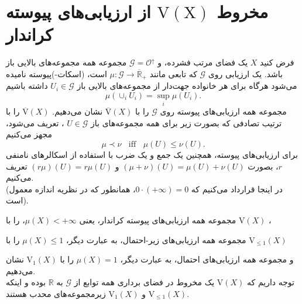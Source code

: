\documentclass[12pt,a4paper]{article}
\theoremstyle{definition}
\theoremstyle{theorem}
\theoremstyle{definition}
\newcommand{\bR}{\mathbb{R}}
\newcommand{\cO}{\mathcal{O}}
\newcommand{\cG}{\mathcal{G}}
\begin{document}
\section{ مخروط $\mathrm{V(X)}$ از ارزیابی‌های پیوسته کراندار}\label{3} 
فرض کنید
$ X $
یک فضای مرتب فشرده، و 
$ \cG=\cO^{\uparrow} $
مجموعه همه مجموعه‌های بالایی باز باشد.  یک ارزیابی روی 
$ \cG $
که تابعی مانند 
$ \mu:\cG\rightarrow \overline{\bR}_{+} $
 است،  (اسکات-)پیوسته 
 نامیده می‌شود هرگاه برای هر خانواده جهت‌دار از مجموعه‌های بالایی باز 
$ U_{i}\in \cG $
داشته باشیم 
$$ \mu(\cup_{i}U_{i})=\sup_{i}\mu(U_{i}). $$
مجموعه همه ارزیابی‌های پیوسته روی 
$ \cG $
را با 
$ \overline{\mathrm{V}}(X) $
نشان می‌دهیم.
$ \overline{\mathrm{V}}(X) $
را با ترتیب تصادفی که بصورت زیر برای همه مجموعه‌های باز 
$ U\in \cG $%
، تعریف می‌شود، مجهز می‌کنیم
$$ \mu\prec \nu \ \ \ \   \text{iff} \ \ \ \ \mu(U)\leq \nu(U). $$
برای ارزیابی‌های پیوسته، همچنین یک جمع و یک ضرب با استفاده از اسکالرهای نامنفی  
$ r $،  بصورت 
$ (\mu+\nu)(U)=\mu(U)+\nu(U) $   
و
$ (r\mu)(U)=r\mu(U) $
تعریف می‌کنیم.\\
(در اینجا قرارداد می‌کنیم که 
$ 0\cdot (+\infty)=0 $، همانطور که در نظریه اندازه معمول است).  

مجموعه همه ارزیابی‌های پیوسته کراندار،  یعنی  
$ \mu(X)<+\infty $، را با 
$ \mathrm{V}(X) $%
،

مجموعه همه ارزیابی‌های زیر-احتمال، به عبارت دیگر،  
$ \mu(X)\leq 1 $
 را با 
$\mathrm{V}_{\leq 1}(X)$

 و مجموعه همه ارزیابی‌های احتمال، به عبارت دیگر،  
$ \mu(X)= 1 $
را با 
$ \mathrm{V}_{1}(X) $
نشان می‌دهیم.\\
توجه داریم که 
$ \mathrm{V}(X) $
یک مخروط در فضای برداری همه توابع از 
$ \cG $
به
$ \bR $
بوده و اینکه 
$ \mathrm{V}_{\leq 1}(X) $
و
$ \mathrm{V}_{1}(X) $
زیرمجموعه‌های محدب هستند.
\end{document}
